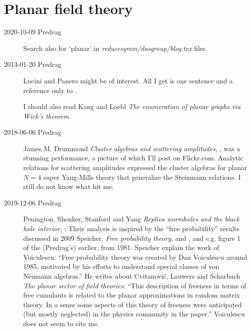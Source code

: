 
\chapter{Planar field theory}
\label{c-planar}

\begin{description}

\item[2020-10-09 Predrag]
Search also for `planar' in \emph{reducesymm/dasgroup/blog.tex} files.

\item[2013-01-20 Predrag]
Lucini and Panero 
might be of interest. All I get is one sentence and a reference only
to .

I should also read Kang and Loebl
{\em The enumeration of planar graphs via {Wick}'s theorem}.

\item[2018-06-06 Predrag]

{James M. Drummond} {\em Cluster algebras and scattering amplitudes},
, was a stunning performance, a picture of which I'll
post on Flickr.com. Analytic relations for scattering amplitudes
expressed the cluster algebras for planar $N=4$ super Yang-Mills theory
that generalize the Steinmann relations.  I still do not know what hit
me.

\item[2019-12-06 Predrag]
\label{post:PSSY19}
Penington, Shenker, Stanford and Yang
{\em Replica wormholes and the black hole interior},
:
Their analysis is inspired by the ``free probability'' results discussed
in 2009 Speicher, {\em Free probability theory},
 and , and e.g. figure 1 of the (Predrag's)
earlier, from 1981.
Speicher explain the work of Voiculescu: ``Free probability theory was
created by Dan Voiculescu around 1985, motivated by his efforts to
understand special classes of von Neumann algebras.'' He writes about
Cvitanovi{\'c}, Lauwers and Scharbach {\em The planar sector of
field theories}: ``This description of freeness in terms of free
cumulants is related to the planar approximations in random matrix theory.
In a sense some aspects of this theory of freeness were anticipated (but
mostly neglected) in the physics community in the  paper.''
Voiculescu does not seem to cite me.


\end{description}

